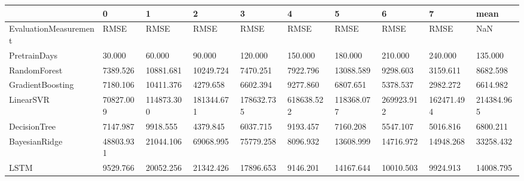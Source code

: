 \begin{tabular}{llllllllll}
\toprule
{} &         0 &          1 &          2 &          3 &          4 &          5 &          6 &          7 &       mean \\
\midrule
EvaluationMeasurement &      RMSE &       RMSE &       RMSE &       RMSE &       RMSE &       RMSE &       RMSE &       RMSE &        NaN \\
PretrainDays          &    30.000 &     60.000 &     90.000 &    120.000 &    150.000 &    180.000 &    210.000 &    240.000 &    135.000 \\
RandomForest          &  7389.526 &  10881.681 &  10249.724 &   7470.251 &   7922.796 &  13088.589 &   9298.603 &   3159.611 &   8682.598 \\
GradientBoosting      &  7180.106 &  10411.376 &   4279.658 &   6602.394 &   9277.860 &   6807.651 &   5378.537 &   2982.272 &   6614.982 \\
LinearSVR             & 70827.009 & 114873.300 & 181344.671 & 178632.735 & 618638.522 & 118368.077 & 269923.912 & 162471.494 & 214384.965 \\
DecisionTree          &  7147.987 &   9918.555 &   4379.845 &   6037.715 &   9193.457 &   7160.208 &   5547.107 &   5016.816 &   6800.211 \\
BayesianRidge         & 48803.931 &  21044.106 &  69068.995 &  75779.258 &   8096.932 &  13608.999 &  14716.972 &  14948.268 &  33258.432 \\
LSTM                  &  9529.766 &  20052.256 &  21342.426 &  17896.653 &   9146.201 &  14167.644 &  10010.503 &   9924.913 &  14008.795 \\
\bottomrule
\end{tabular}
